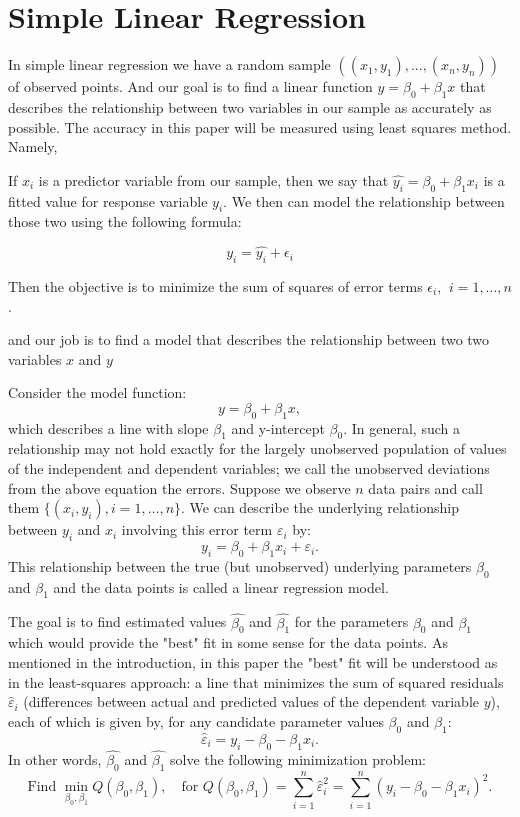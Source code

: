 \documentclass[12pt,a4paper,oneside]{book} %
\begin{document}
	\section{Simple Linear Regression}

In simple linear regression we have a random sample $((x_1,y_1),...,(x_n,y_n))$ of observed points. And our goal is to find a linear function $y=\beta_0 + \beta_1x$ that describes the relationship between two variables in our sample as accurately as possible. The accuracy in this paper will be measured using least squares method. Namely,

If $x_i$ is a predictor variable from our sample, then we say that $\hat{y_i}=\beta_0+\beta_1x_i$ is a fitted  value for response variable $y_i$. We then can model the relationship between those two using the following formula:

\[
	y_i = \hat{y_i} + \epsilon_i 	
\]

Then the objective is to minimize the sum of squares of error terms $\epsilon_i$, $\ i=1,...,n$.


and our job is to find a model that describes the relationship between two two variables $x$ and $y$
 




Consider the model function:
\[
y = \beta_0 + \beta_1 x,
\]
which describes a line with slope $\beta_1$ and y-intercept $\beta_0$. In general, such a relationship may not hold exactly for the largely unobserved population of values of the independent and dependent variables; we call the unobserved deviations from the above equation the errors. Suppose we observe $n$ data pairs and call them $\{(x_i, y_i), i = 1, \ldots, n\}$. We can describe the underlying relationship between $y_i$ and $x_i$ involving this error term $\varepsilon_i$ by:
\[
y_i = \beta_0 + \beta_1 x_i + \varepsilon_i.
\]
This relationship between the true (but unobserved) underlying parameters $\beta_0$ and $\beta_1$ and the data points is called a linear regression model.

The goal is to find estimated values $\hat{\beta_0}$ and $\hat{\beta_1}$ for the parameters $\beta_0$ and $\beta_1$ which would provide the "best" fit in some sense for the data points. As mentioned in the introduction, in this paper the "best" fit will be understood as in the least-squares approach: a line that minimizes the sum of squared residuals $\hat{\varepsilon}_i$ (differences between actual and predicted values of the dependent variable $y$), each of which is given by, for any candidate parameter values $\beta_0$ and $\beta_1$:
\[
\hat{\varepsilon}_i = y_i - \beta_0 - \beta_1 x_i.
\]
In other words, $\hat{\beta_0}$ and $\hat{\beta_1}$ solve the following minimization problem:
\[
\text{Find } \min_{\beta_0, \beta_1} Q(\beta_0, \beta_1), \quad \text{for } Q(\beta_0, \beta_1) = \sum_{i=1}^{n} \hat{\varepsilon}_i^2 = \sum_{i=1}^{n} (y_i - \beta_0 - \beta_1 x_i)^2.
\]
\end{document}
